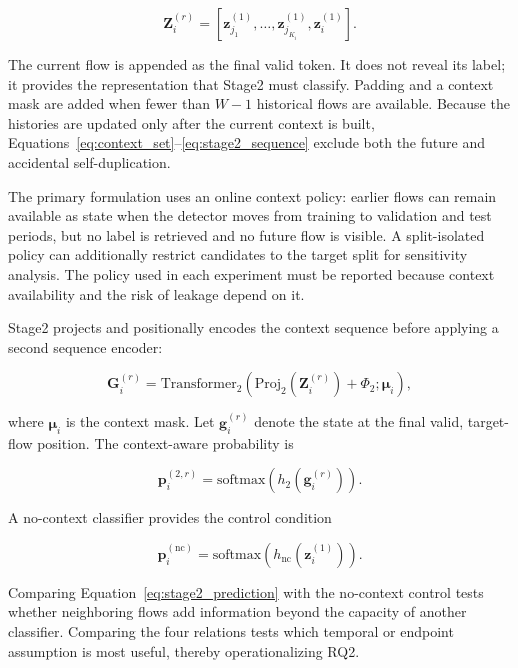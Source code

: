 \begin{equation}
\mathbf{Z}^{(r)}_i
=
\left[
    \mathbf{z}^{(1)}_{j_1},
    \ldots,
    \mathbf{z}^{(1)}_{j_{K_i}},
    \mathbf{z}^{(1)}_i
\right].
\label{eq:stage2_sequence}
\end{equation}

The current flow is appended as the final valid token. It does not reveal its
label; it provides the representation that Stage2 must classify. Padding and a
context mask are added when fewer than $W-1$ historical flows are available.
Because the histories are updated only after the current context is built,
Equations~\ref{eq:context_set}--\ref{eq:stage2_sequence} exclude both the future
and accidental self-duplication.

The primary formulation uses an online context policy: earlier flows can remain
available as state when the detector moves from training to validation and test
periods, but no label is retrieved and no future flow is visible. A
split-isolated policy can additionally restrict candidates to the target split
for sensitivity analysis. The policy used in each experiment must be reported
because context availability and the risk of leakage depend on it.

Stage2 projects and positionally encodes the context sequence before applying a
second sequence encoder:

\begin{equation}
\mathbf{G}^{(r)}_i
=
\mathrm{Transformer}_{2}
\left(
    \mathrm{Proj}_{2}(\mathbf{Z}^{(r)}_i)
    +\Phi_{2};
    \boldsymbol{\mu}_i
\right),
\end{equation}

where $\boldsymbol{\mu}_i$ is the context mask. Let
$\mathbf{g}^{(r)}_i$ denote the state at the final valid, target-flow position.
The context-aware probability is

\begin{equation}
\mathbf{p}^{(2,r)}_i
=
\mathrm{softmax}
\left(
    h_2(\mathbf{g}^{(r)}_i)
\right).
\label{eq:stage2_prediction}
\end{equation}

A no-context classifier provides the control condition

\begin{equation}
\mathbf{p}^{(\mathrm{nc})}_i
=
\mathrm{softmax}
\left(
    h_{\mathrm{nc}}(\mathbf{z}^{(1)}_i)
\right).
\end{equation}

Comparing Equation~\ref{eq:stage2_prediction} with the no-context control tests
whether neighboring flows add information beyond the capacity of another
classifier. Comparing the four relations tests which temporal or endpoint
assumption is most useful, thereby operationalizing RQ2.

